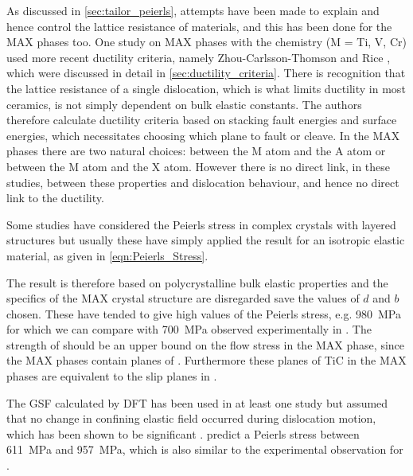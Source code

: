 %
%
%
%
%
%
%
%
%
%
%
%


As discussed in \autoref{sec:tailor_peierls}, attempts have been made to explain and hence control the lattice resistance of materials, and this has been done for the MAX phases too. One study on MAX phases \cite{Music2007ductility} with the chemistry  (M = Ti, V, Cr) used more recent ductility criteria, namely Zhou-Carlsson-Thomson \cite{Zhou1994} and Rice \cite{Rice1992}, which were discussed in detail in \autoref{sec:ductility_criteria}. There is recognition that the lattice resistance of a single dislocation, which is what limits ductility in most ceramics, is not simply dependent on bulk elastic constants. The authors therefore calculate ductility criteria based on stacking fault energies and surface energies, which necessitates choosing which plane to fault or cleave. In the MAX phases there are two natural choices: between the M atom and the A atom or between the M atom and the X atom. However there is no direct link, in these studies, between these properties and dislocation behaviour, and hence no direct link to the ductility. 

Some studies have considered the Peierls stress in complex crystals with layered structures \cite{Music2008,Emmerlich2009,Gouriet2015} but usually these have simply applied the result for an isotropic elastic material, as given in \autoref{eqn:Peierls_Stress}.


The result is therefore based on polycrystalline bulk elastic properties and the specifics of the MAX crystal structure are disregarded save the values of $d$ and $b$ chosen. These have tended to give high values of the Peierls stress, e.g. \SI{980}{\mega\pascal} for  \cite{Music2008} which we can compare with \SI{700}{\mega\pascal} observed experimentally in  \cite{Clegg2006}. %
The strength of  should be an upper bound on the flow stress in the MAX phase, since the MAX phases contain planes of . Furthermore these planes of TiC in the MAX phases are equivalent to the slip planes in  \cite{Hollox1966}. 

The GSF calculated by DFT has been used in at least one study \cite{Gouriet2015} but assumed that no change in confining elastic field occurred during dislocation motion, which has been shown to be significant \cite{Lubarda2007,Clegg2006}. \citet{Gouriet2015} predict a Peierls stress between \SI{611}{\mega\pascal} and \SI{957}{\mega\pascal}, which is also similar to the experimental observation for .

